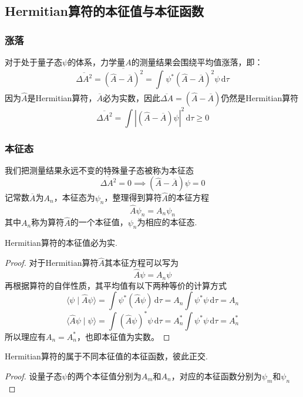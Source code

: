 \subsection{Hermitian算符的本征值与本征函数}

\subsubsection{涨落}
对于处于量子态$\psi$的体系，力学量$A$的测量结果会围绕平均值涨落，即：
$$
    \overline{\Delta A^2}
    = \overline{\left(\hat{A}-\overline{A}\right)^2}
    = \int_{}^{}\psi^*\left(\hat{A}-\overline{A}\right)^2\psi\,\mathrm{d}\tau
$$
因为$\hat{A}$是Hermitian算符，$\overline{A}$必为实数，因此$\overline{\Delta A}=\left(\hat{A}-\overline{A}\right)$仍然是Hermitian算符
$$
    \overline{\Delta A^2} = \int\left|\left(\hat{A}-\overline{A}\right)\psi\right|^2\,\mathrm{d}\tau \geqslant 0
$$

\subsubsection{本征态}
我们把测量结果永远不变的特殊量子态被称为本征态
$$
    \overline{\Delta A^2}=0 \implies \left(\hat{A}-\overline{A}\right)\psi = 0
$$
记常数$\overline{A}$为$A_n$，本征态为$\psi_n$，整理得到算符$\hat{A}$的本征方程
$$
    \hat{A}\psi_n = A_n\psi_n
$$
其中$A_n$称为算符$\hat{A}$的一个本征值，$\psi_n$为相应的本征态.




\begin{theorem}
    Hermitian算符的本征值必为实.
\end{theorem}
\begin{proof}
    对于Hermitian算符$\hat{A}$其本征方程可以写为
    $$
        \hat{A}\psi = A_n\psi
    $$
    再根据算符的自伴性质，其平均值有以下两种等价的计算方式
    $$
        \langle\psi\mid\hat{A}\psi\rangle
        =\int\psi^*\left(\hat{A}\psi\right)\,\mathrm{d}\tau
        =A_n\int\psi^*\psi\,\mathrm{d}\tau
        =A_n
    $$
    $$
        \langle\hat{A}\psi\mid\psi\rangle
        =\int\left(\hat{A}\psi\right)^*\psi\,\mathrm{d}\tau
        =A_n^*\int\psi^*\psi\,\mathrm{d}\tau
        =A_n^*
    $$
    所以理应有$A_n=A_n^*$，也即本征值为实数。
\end{proof}




\begin{theorem}
    Hermitian算符的属于不同本征值的本征函数，彼此正交.
\end{theorem}
\begin{proof}
    设量子态$\psi$的两个本征值分别为$A_m$和$A_n$，对应的本征函数分别为$\psi_m$和$\psi_n$
\end{proof}


